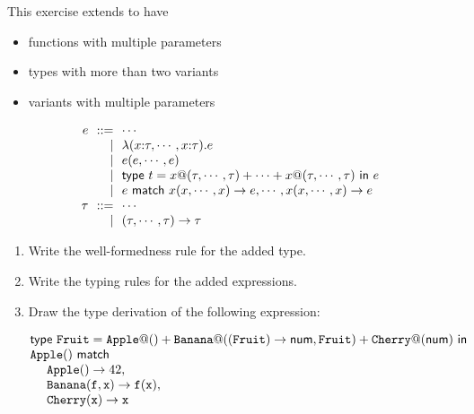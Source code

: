\begin{exercise}

This exercise extends \Lang to have
  \begin{itemize}
      \item functions with multiple parameters
      \item types with more than two variants
      \item variants with multiple parameters
  \end{itemize}
\[
  \begin{array}{@{}r@{~~}r@{~~}l}
    e & ::= & \cdots \\
    &|& \efun{(x{:}\tau,\cdots,x{:}\tau)}{e} \\
    &|& e(e,\cdots,e) \\
    &|& \textsf{type}\ t=x@(\tau,\cdots,\tau)+\cdots+x@(\tau,\cdots,\tau)\ \textsf{in}\ e \\
    &|& e\ \textsf{match}\ x(x,\cdots,x)\rightarrow e,\cdots,x(x,\cdots,x)\rightarrow e \\
    \tau & ::= & \cdots \\
    &|& \tarrow{(\tau,\cdots,\tau)}{\tau}
  \end{array}
\]

\begin{enumerate}
  \item Write the well-formedness rule for the added type.
  \item Write the typing rules for the added expressions.
  \item Draw the type derivation of the following expression:

    $
    \begin{array}{@{}l}
      \textsf{type}\ \code{Fruit}=
      \code{Apple}@()+
      \code{Banana}@(\tarrow{(\code{Fruit})}{\tnum},\code{Fruit})+
      \code{Cherry}@(\tnum)\ \textsf{in} \\
      \code{Apple}()\ \textsf{match} \\
      \ \ \ \ \code{Apple}()\rightarrow 42,\\
      \ \ \ \ \code{Banana}(\cf,\cx)\rightarrow \cf(\cx),\\
      \ \ \ \ \code{Cherry}(\cx)\rightarrow \cx
    \end{array}
    $
\end{enumerate}

\end{exercise}

